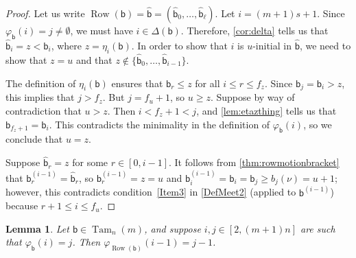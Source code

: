 \documentclass[11pt]{amsart}
\newtheorem{lemma}[theorem]{Lemma}
\theoremstyle{definition}
\DeclareMathOperator{\Tam}{Tam}
\DeclareMathOperator{\row}{Row}
\begin{document}
\begin{proof}
Let us write $\row(\mathsf b)=\widehat{\mathsf b}=(\widehat{\mathsf b}_0,\ldots,\widehat{\mathsf b}_\ell)$. Let $i=(m+1)s+1$. Since $\varphi_{\mathsf b}(i)=j\neq\emptyset$, we must have $i\in\Delta(\mathsf b)$. Therefore, \cref{cor:delta} tells us that $\widehat{\mathsf b}_i=z<\mathsf b_i$, where $z=\eta_i(\mathsf b)$. In order to show that $i$ is $u$-initial in $\widehat{\mathsf b}$, we need to show that $z=u$ and that $z\not\in\{\widehat{\mathsf b}_0,\ldots,\widehat{\mathsf b}_{i-1}\}$. 

The definition of $\eta_i(\mathsf b)$ ensures that $\mathsf b_r\leq z$ for all $i\leq r\leq f_z$. Since $\mathsf b_j=\mathsf b_i>z$, this implies that $j>f_z$. But $j=f_{u}+1$, so $u\geq z$. Suppose by way of contradiction that $u>z$. Then $i<f_z+1<j$, and \cref{lem:etazthing} tells us that $\mathsf b_{f_z+1}=\mathsf b_i$. This contradicts the minimality in the definition of $\varphi_{\mathsf b}(i)$, so we conclude that $u=z$. 

Suppose $\widehat{\mathsf b}_r=z$ for some $r\in[0,i-1]$. It follows from \cref{thm:rowmotionbracket} that $\mathsf b_r^{(i-1)}=\widehat{\mathsf b}_r$, so $\mathsf b_r^{(i-1)}=z=u$ and $\mathsf b_i^{(i-1)}=\mathsf b_i=\mathsf b_j\geq b_j(\nu)=u+1$; however, this contradicts condition~\eqref{Item3} in \cref{DefMeet2} (applied to $\mathsf b^{(i-1)}$) because $r+1\leq i\leq f_{u}$. 
\end{proof}

\begin{lemma}\label{lem:Claim1}
Let $\mathsf b\in\Tam_n(m)$, and suppose $i,j\in[2,(m+1)n]$ are such that $\varphi_{\mathsf b}(i)=j$. Then $\varphi_{\row(\mathsf b)}(i-1)=j-1$. 
\end{lemma}
\end{document}

